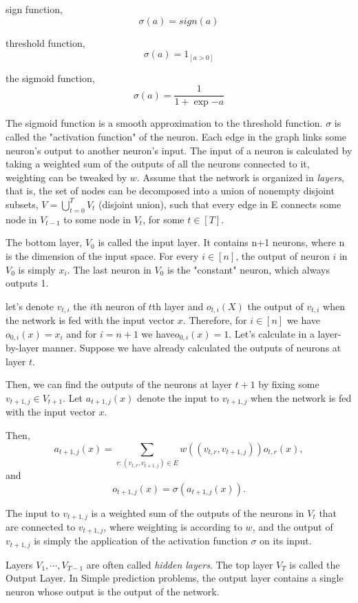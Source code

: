 sign function, $$\sigma(a) = sign(a)$$

threshold function, $$\sigma(a) = 1_{[a>0]}$$

the sigmoid function, $$\sigma(a) = \frac{1}{1+\exp{-a}}$$

The sigmoid function is a smooth approximation to the threshold function. $\sigma$ is called the "activation function" of the neuron.
Each edge in the graph links some neuron's output to another neuron's input. The input of a neuron is calculated by taking a weighted sum of the outputs of all the neurons connected to it, weighting can be tweaked by $w$.
Assume that the network is organized in \textit{layers}, that is, the set of nodes can be decomposed into a union of nonempty disjoint subsets, $V=\bigcup_{t=0}^{T}V_{t}$ (disjoint union), such that every edge in E connects some node in $V_{t-1}$ to some node in $V_{t}$, for some $t\in [T]$.

The bottom layer, $V_{0}$ is called the input layer. It contains n+1 neurons, where n is the dimension of the input space. For every $i\in[n]$, the output of neuron $i$ in $V_{0}$ is simply $x_{i}$.
The last neuron in $V_{0}$ is the "constant" neuron, which always outputs 1.

let's denote $v_{t,i}$ the $i$th neuron of $t$th layer
and $o_{t,i}(X)$ the output of $v_{t,i}$ when the network is fed with the input vector $x$.
Therefore, for $i\in[n]$ we have $o_{0,i}(x) = x_{i}$ and for $i = n+1$ we have$o_{0,i}(x)=1$.
Let's calculate in a layer-by-layer manner. Suppose we have already calculated the outputs of neurons at layer $t$.

Then, we can find the outputs of the neurons at layer $t+1$ by fixing some $v_{t+1,j}\in V_{t+1}$.
Let $a_{t+1,j}(x)$ denote the input to $v_{t+1,j}$ when the network is fed with the input vector $x$.

Then, $$a_{t+1,j}(x) = \sum_{r:(v_{t,r},v_{t+1,j})\in E}w((v_{t,r},v_{t+1,j}))o_{t,r}(x),$$ and $$o_{t+1,j}(x) = \sigma( a_{t+1,j}(x)) .$$

The input to $v_{t+1,j}$ is a weighted sum of the outputs of the neurons in $V_{t}$ that are connected to $v_{t+1,j}$, where weighting is according to $w$, and the output of $v_{t+1,j}$ is simply the application of the activation function $\sigma$ on its input.

Layers $V_{1},\cdots,V_{T-1}$ are often called \textit{hidden layers}. The top layer $V_{T}$ is called the Output Layer.
In Simple prediction problems, the output layer contains a single neuron whose output is the output of the network.

